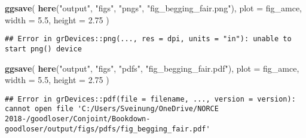\documentclass[]{book}
\newenvironment{Shaded}{\begin{snugshade}}{\end{snugshade}}
\newcommand{\KeywordTok}[1]{\textcolor[rgb]{0.13,0.29,0.53}{\textbf{#1}}}
\newcommand{\DataTypeTok}[1]{\textcolor[rgb]{0.13,0.29,0.53}{#1}}
\newcommand{\FloatTok}[1]{\textcolor[rgb]{0.00,0.00,0.81}{#1}}
\newcommand{\StringTok}[1]{\textcolor[rgb]{0.31,0.60,0.02}{#1}}
\newcommand{\NormalTok}[1]{#1}
\begin{document}
\begin{Shaded}
\begin{Highlighting}[]
\KeywordTok{ggsave}\NormalTok{(}
  \KeywordTok{here}\NormalTok{(}\StringTok{"output"}\NormalTok{, }\StringTok{"figs"}\NormalTok{, }\StringTok{"pngs"}\NormalTok{, }\StringTok{"fig_begging_fair.png"}\NormalTok{),}
  \DataTypeTok{plot =}\NormalTok{ fig_amce,}
  \DataTypeTok{width =} \FloatTok{5.5}\NormalTok{, }\DataTypeTok{height =} \FloatTok{2.75}
\NormalTok{)}
\end{Highlighting}
\end{Shaded}

\begin{verbatim}
## Error in grDevices::png(..., res = dpi, units = "in"): unable to start png() device
\end{verbatim}

\begin{Shaded}
\begin{Highlighting}[]
\KeywordTok{ggsave}\NormalTok{(}
  \KeywordTok{here}\NormalTok{(}\StringTok{"output"}\NormalTok{, }\StringTok{"figs"}\NormalTok{, }\StringTok{"pdfs"}\NormalTok{, }\StringTok{"fig_begging_fair.pdf"}\NormalTok{),}
  \DataTypeTok{plot =}\NormalTok{ fig_amce,}
  \DataTypeTok{width =} \FloatTok{5.5}\NormalTok{, }\DataTypeTok{height =} \FloatTok{2.75}
\NormalTok{)}
\end{Highlighting}
\end{Shaded}

\begin{verbatim}
## Error in grDevices::pdf(file = filename, ..., version = version): cannot open file 'C:/Users/Sveinung/OneDrive/NORCE 2018-/goodloser/Conjoint/Bookdown-goodloser/output/figs/pdfs/fig_begging_fair.pdf'
\end{verbatim}
\end{document}
